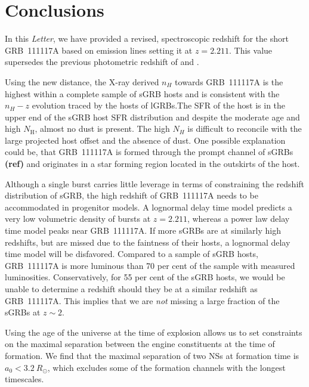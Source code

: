 \documentclass{aa}    %
\newcommand\todo[1]{\textbf{(#1)}}
\begin{document}
\section{Conclusions}

In this \emph{Letter}, we have provided a revised, spectroscopic redshift for
the short GRB~111117A based on emission lines setting it at $z = 2.211$. This
value supersedes the previous photometric redshift of \citet{Margutti2012} and
\citet{Sakamoto2013}. %

Using the new distance, the X-ray derived $n_H$ towards GRB~111117A is the
highest within a complete sample of sGRB hosts and is consistent with the
$n_H-z$ evolution traced by the hosts of lGRBs.The SFR of the host is in the
upper end of the sGRB host SFR distribution and despite the moderate age and
high $N_\mathrm{H}$, almost no dust is present. The high $N_H$ is difficult to
reconcile with the large projected host offset and the absence of dust. One
possible explanation could be, that GRB~111117A is formed through the prompt
channel of sGRBs \todo{ref} and originates in a star forming region located in
the outskirts of the host.

Although a single burst carries little leverage in terms of constraining the
redshift distribution of sGRB, the high redshift of GRB~111117A needs to be
accommodated in progenitor models. A lognormal delay time model predicts a very low volumetric
density of bursts at $z = 2.211$, whereas a power law delay time model peaks
near GRB~111117A. If more sGRBs are at similarly high redshifts, but are missed due to
the faintness of their hosts, a lognormal delay time model will be disfavored.
Compared to a sample of sGRB hosts, GRB~111117A is more luminous than 70 per
cent of the sample with measured luminosities. Conservatively, for 55 per
cent of the sGRB hosts, we would be unable to determine a redshift should they be at 
a similar redshift as GRB~111117A. This implies that we are \textit{not} missing a large
fraction of the sGRBs at $z \sim 2$.

Using the age of the universe at the time of explosion allows us to set
constraints on the maximal separation between the engine constituents at the
time of formation. We find that the maximal separation of two NSs at
formation time is $a_0 < 3.2~R_\odot$, which excludes some of the formation
channels with the longest timescales.
\end{document}
